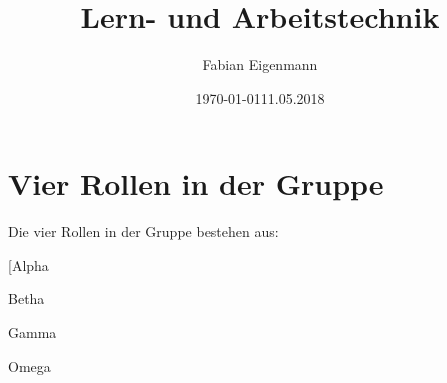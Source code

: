 \documentclass{article}
\begin{document}

\author{Fabian Eigenmann} %
\title{Lern- und Arbeitstechnik{}} %
\date{\today{11.05.2018}} %
\maketitle{} %
\tableofcontents{} %

\section{Vier Rollen in der Gruppe} %
Die vier Rollen in der Gruppe bestehen aus:
\item[[Alpha]
\item[Betha]
\item[Gamma]
\item[Omega]
\subsection{}
\subsubsection{}
\paragraph{} %
\subparagraph{}
\end{document}

